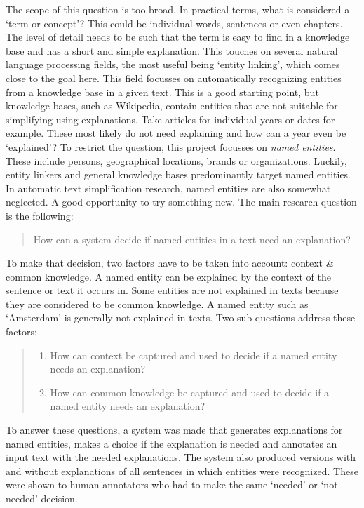 \documentclass[
10pt, %
a4paper, %
oneside, %
headinclude,footinclude, %
] {book}%
\begin{document}
The scope of this question is too broad.
In practical terms, what is considered a `term or concept'?
This could be individual words, sentences or even chapters.
The level of detail needs to be such that the term is easy to find in a knowledge base and has a short and simple explanation.
This touches on several natural language processing fields, the most useful being `entity linking', which comes close to the goal here.
This field focusses on automatically recognizing entities from a knowledge base in a given text.
This is a good starting point, but knowledge bases, such as Wikipedia, contain entities that are not suitable for simplifying using explanations.
Take articles for individual years or dates for example.
These most likely do not need explaining and how can a year even be `explained'?
To restrict the question, this project focusses on \textit{named entities}.
These include persons, geographical locations, brands or organizations.
Luckily, entity linkers and general knowledge bases predominantly target named entities.
In automatic text simplification research, named entities are also somewhat neglected.
A good opportunity to try something new.
The main research question is the following:

\begin{quote}
  How can a system decide if named entities in a text need an explanation?
\end{quote}

To make that decision, two factors have to be taken into account: context \& common knowledge.
A named entity can be explained by the context of the sentence or text it occurs in.
Some entities are not explained in texts because they are considered to be common knowledge.
A named entity such as `Amsterdam' is generally not explained in texts.
Two sub questions address these factors:

\begin{quote}
  \begin{enumerate}
    \item How can context be captured and used to decide if a named entity needs an explanation?
    \item How can common knowledge be captured and used to decide if a named entity needs an explanation?
  \end{enumerate}
\end{quote}

To answer these questions, a system was made that generates explanations for named entities, makes a choice if the explanation is needed and annotates an input text with the needed explanations.
The system also produced versions with and without explanations of all sentences in which entities were recognized.
These were shown to human annotators who had to make the same `needed' or `not needed' decision.
\end{document}

